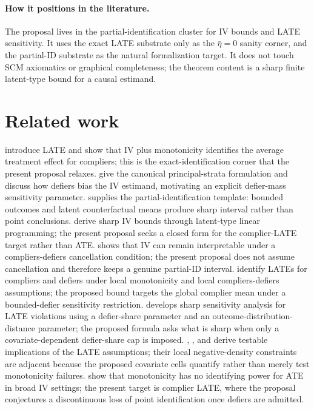\documentclass[11pt]{article}
\theoremstyle{definition}
\theoremstyle{plain}
\theoremstyle{remark}
\begin{document}
\paragraph{How it positions in the literature.}
The proposal lives in the partial-identification cluster for IV bounds and LATE sensitivity.  It uses the exact LATE substrate only as the \(\bar\eta=0\) sanity corner, and the partial-ID substrate as the natural formalization target.  It does not touch SCM axiomatics or graphical completeness; the theorem content is a sharp finite latent-type bound for a causal estimand.

\section{Related work}
\citet{ImbensAngrist1994} introduce LATE and show that IV plus monotonicity identifies the average treatment effect for compliers; this is the exact-identification corner that the present proposal relaxes.  \citet{AngristImbensRubin1996} give the canonical principal-strata formulation and discuss how defiers bias the IV estimand, motivating an explicit defier-mass sensitivity parameter.  \citet{Manski1990} supplies the partial-identification template: bounded outcomes and latent counterfactual means produce sharp interval rather than point conclusions.  \citet{BalkePearl1997} derive sharp IV bounds through latent-type linear programming; the present proposal seeks a closed form for the complier-LATE target rather than ATE.  \citet{deChaisemartin2017} shows that IV can remain interpretable under a compliers-defiers cancellation condition; the present proposal does not assume cancellation and therefore keeps a genuine partial-ID interval.  \citet{DahlHuberMellace2023} identify LATEs for compliers and defiers under local monotonicity and local compliers-defiers assumptions; the proposed bound targets the global complier mean under a bounded-defier sensitivity restriction.  \citet{Noack2021} develops sharp sensitivity analysis for LATE violations using a defier-share parameter and an outcome-distribution-distance parameter; the proposed formula asks what is sharp when only a covariate-dependent defier-share cap is imposed.  \citet{HuberMellace2015}, \citet{Kitagawa2015}, and \citet{MourifieWan2017} derive testable implications of the LATE assumptions; their local negative-density constraints are adjacent because the proposed covariate cells quantify rather than merely test monotonicity failures.  \citet{BaiHuangMoonShaikhVytlacil2024} show that monotonicity has no identifying power for ATE in broad IV settings; the present target is complier LATE, where the proposal conjectures a discontinuous loss of point identification once defiers are admitted.
\end{document}
